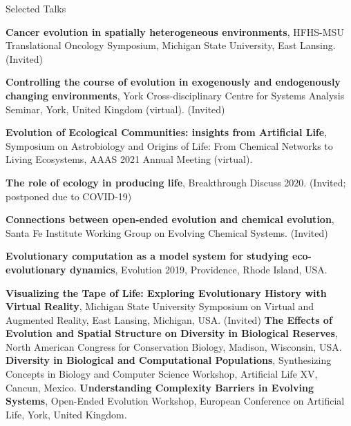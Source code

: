 \begin{rubric}{Selected Talks}

\entry*[2021] \textbf{Cancer evolution in spatially heterogeneous environments}, HFHS-MSU Translational Oncology Symposium, Michigan State University, East Lansing. (Invited)

\entry*[2021] \textbf{Controlling the course of evolution in exogenously and endogenously changing environments}, York Cross-disciplinary Centre for Systems Analysis Seminar, York, United Kingdom (virtual). (Invited)

\entry*[2021] \textbf{Evolution of Ecological Communities: insights from Artificial Life}, Symposium on Astrobiology and Origins of Life: From Chemical Networks to Living Ecosystems, AAAS 2021 Annual Meeting (virtual).

\entry*[Postponed] \textbf{The role of ecology in producing life}, Breakthrough Discuss 2020. (Invited; postponed due to COVID-19)

\entry*[2019] \textbf{Connections between open-ended evolution and chemical evolution}, Santa Fe Institute Working Group on Evolving Chemical Systems. (Invited)

\entry*[2019] \textbf{Evolutionary computation as a model system for studying eco-evolutionary dynamics}, Evolution 2019, Providence, Rhode Island, USA.

\entry*[2018] \textbf{Visualizing the Tape of Life: Exploring Evolutionary History with Virtual Reality}, Michigan State University Symposium on Virtual and Augmented Reality, East Lansing, Michigan, USA. (Invited)
%
\entry*[2016] \textbf{The Effects of Evolution and Spatial Structure on Diversity in Biological Reserves}, North American Congress for Conservation Biology, Madison, Wisconsin, USA. 
%
\entry*[2016] \textbf{Diversity in Biological and Computational Populations}, Synthesizing Concepts in Biology and Computer Science Workshop, Artificial Life XV, Cancun, Mexico. 
%
\entry*[2015] \textbf{Understanding Complexity Barriers in Evolving Systems}, Open-Ended Evolution Workshop, European Conference on Artificial Life, York, United Kingdom. 


\end{rubric}